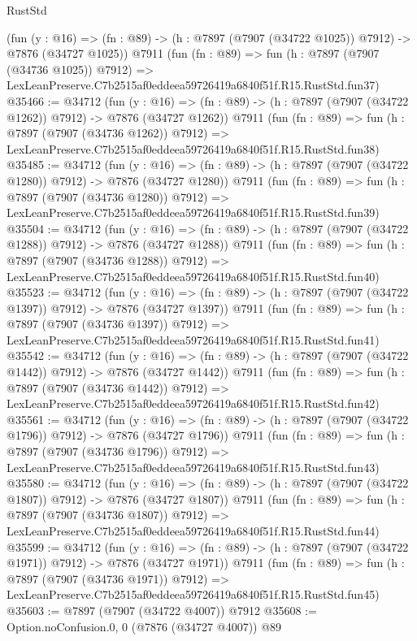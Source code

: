 \begin{lexlean}{RustStd}
\begin{coremodule}
    (fun (y : @16) =>
    (fn : @89) -> (h : @7897 (@7907 (@34722 @1025)) @7912) -> @7876 (@34727 @1025))
    @7911
    (fun (fn : @89) =>
    fun (h : @7897 (@7907 (@34736 @1025)) @7912) =>
    LexLeanPreserve.C7b2515af0eddeea59726419a6840f51f.R15.RustStd.fun37)
@35466 := @34712
    (fun (y : @16) =>
    (fn : @89) -> (h : @7897 (@7907 (@34722 @1262)) @7912) -> @7876 (@34727 @1262))
    @7911
    (fun (fn : @89) =>
    fun (h : @7897 (@7907 (@34736 @1262)) @7912) =>
    LexLeanPreserve.C7b2515af0eddeea59726419a6840f51f.R15.RustStd.fun38)
@35485 := @34712
    (fun (y : @16) =>
    (fn : @89) -> (h : @7897 (@7907 (@34722 @1280)) @7912) -> @7876 (@34727 @1280))
    @7911
    (fun (fn : @89) =>
    fun (h : @7897 (@7907 (@34736 @1280)) @7912) =>
    LexLeanPreserve.C7b2515af0eddeea59726419a6840f51f.R15.RustStd.fun39)
@35504 := @34712
    (fun (y : @16) =>
    (fn : @89) -> (h : @7897 (@7907 (@34722 @1288)) @7912) -> @7876 (@34727 @1288))
    @7911
    (fun (fn : @89) =>
    fun (h : @7897 (@7907 (@34736 @1288)) @7912) =>
    LexLeanPreserve.C7b2515af0eddeea59726419a6840f51f.R15.RustStd.fun40)
@35523 := @34712
    (fun (y : @16) =>
    (fn : @89) -> (h : @7897 (@7907 (@34722 @1397)) @7912) -> @7876 (@34727 @1397))
    @7911
    (fun (fn : @89) =>
    fun (h : @7897 (@7907 (@34736 @1397)) @7912) =>
    LexLeanPreserve.C7b2515af0eddeea59726419a6840f51f.R15.RustStd.fun41)
@35542 := @34712
    (fun (y : @16) =>
    (fn : @89) -> (h : @7897 (@7907 (@34722 @1442)) @7912) -> @7876 (@34727 @1442))
    @7911
    (fun (fn : @89) =>
    fun (h : @7897 (@7907 (@34736 @1442)) @7912) =>
    LexLeanPreserve.C7b2515af0eddeea59726419a6840f51f.R15.RustStd.fun42)
@35561 := @34712
    (fun (y : @16) =>
    (fn : @89) -> (h : @7897 (@7907 (@34722 @1796)) @7912) -> @7876 (@34727 @1796))
    @7911
    (fun (fn : @89) =>
    fun (h : @7897 (@7907 (@34736 @1796)) @7912) =>
    LexLeanPreserve.C7b2515af0eddeea59726419a6840f51f.R15.RustStd.fun43)
@35580 := @34712
    (fun (y : @16) =>
    (fn : @89) -> (h : @7897 (@7907 (@34722 @1807)) @7912) -> @7876 (@34727 @1807))
    @7911
    (fun (fn : @89) =>
    fun (h : @7897 (@7907 (@34736 @1807)) @7912) =>
    LexLeanPreserve.C7b2515af0eddeea59726419a6840f51f.R15.RustStd.fun44)
@35599 := @34712
    (fun (y : @16) =>
    (fn : @89) -> (h : @7897 (@7907 (@34722 @1971)) @7912) -> @7876 (@34727 @1971))
    @7911
    (fun (fn : @89) =>
    fun (h : @7897 (@7907 (@34736 @1971)) @7912) =>
    LexLeanPreserve.C7b2515af0eddeea59726419a6840f51f.R15.RustStd.fun45)
@35603 := @7897 (@7907 (@34722 @4007)) @7912
@35608 := Option.noConfusion.{0, 0} (@7876 (@34727 @4007)) @89

\end{coremodule}
\end{lexlean}
